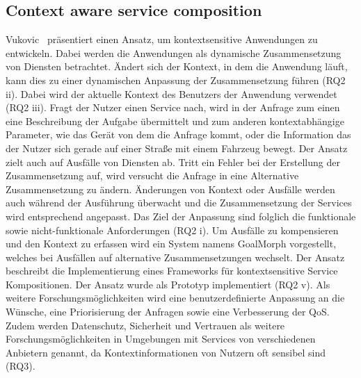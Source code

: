 \documentclass[conference,compsoc]{IEEEtran}
\begin{document}
\subsection{Context aware service composition}
Vukovic~\cite{vukovic2007context} präsentiert einen Ansatz, um kontextsensitive Anwendungen zu entwickeln. Dabei werden die Anwendungen als dynamische Zusammensetzung von Diensten betrachtet. Ändert sich der Kontext, in dem die Anwendung läuft, kann dies zu einer dynamischen Anpassung der Zusammensetzung führen (RQ2 ii). Dabei wird der aktuelle Kontext des Benutzers der Anwendung verwendet (RQ2 iii). Fragt der Nutzer einen Service nach, wird in der Anfrage zum einen eine Beschreibung der Aufgabe übermittelt und zum anderen kontextabhängige Parameter, wie das Gerät von dem die Anfrage kommt, oder die Information das der Nutzer sich gerade auf einer Straße mit einem Fahrzeug bewegt.
Der Ansatz zielt auch auf Ausfälle von Diensten ab. Tritt ein Fehler bei der Erstellung der Zusammensetzung auf, wird versucht die Anfrage in eine Alternative Zusammensetzung zu ändern.
Änderungen von Kontext oder Ausfälle werden auch während der Ausführung überwacht und die Zusammensetzung der Services wird entsprechend angepasst.
Das Ziel der Anpassung sind folglich die funktionale sowie nicht-funktionale Anforderungen (RQ2 i).
Um Ausfälle zu kompensieren und den Kontext zu erfassen wird ein System namens GoalMorph vorgestellt, welches bei Ausfällen auf alternative Zusammensetzungen wechselt. Der Ansatz beschreibt die Implementierung eines Frameworks für kontextsensitive Service Kompositionen. Der Ansatz wurde als Prototyp implementiert (RQ2 v).
Als weitere Forschungsmöglichkeiten wird eine benutzerdefinierte Anpassung an die Wünsche, eine Priorisierung der Anfragen sowie eine Verbesserung der QoS. Zudem werden Datenschutz, Sicherheit und Vertrauen als weitere Forschungsmöglichkeiten in Umgebungen mit Services von verschiedenen Anbietern genannt, da Kontextinformationen von Nutzern oft sensibel sind (RQ3).
\end{document}
